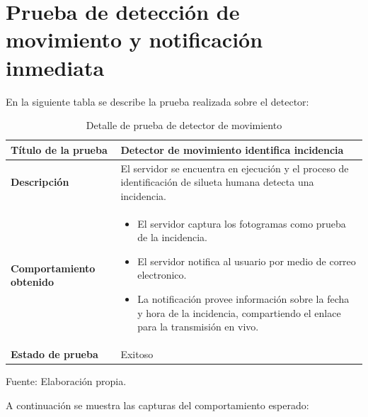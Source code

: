 \section{Prueba de detección de movimiento y notificación inmediata}

En la siguiente tabla se describe la prueba realizada sobre el detector:\\

\begin{table}[H]
    \caption{Detalle de prueba de detector de movimiento}
    \begin{center}
        \begin{tabular}{|>{\centering}p{}|m{}<{\centering}|} 
            \hline
            \textbf{Título de la prueba} & Detector de movimiento identifica incidencia \\
            \hline
            \textbf{Descripción} & El servidor se encuentra en ejecución y el proceso de identificación de silueta humana detecta una incidencia.\\
            \hline
            \textbf{Comportamiento obtenido} & 
            \begin{itemize}
                \item El servidor captura los fotogramas como prueba de la incidencia.
                \item El servidor notifica al usuario por medio de correo electronico.
                \item La notificación provee información sobre la fecha y hora de la incidencia, compartiendo el enlace para la transmisión en vivo.
            \end{itemize} \\ 
            \hline
            \textbf{Estado de prueba} & Exitoso \\
            \hline
        \end{tabular}
    \end{center}
    \begin{center}
        Fuente: Elaboración propia.
    \end{center}
\end{table}

A continuación se muestra las capturas del comportamiento esperado:

